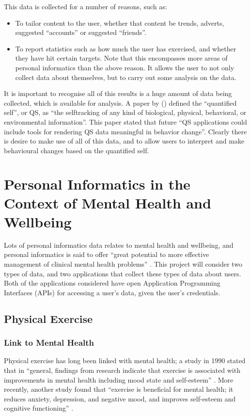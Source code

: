 \documentclass[11pt,openright,a4paper]{report}
\begin{document}
This data is collected for a number of reasons, such as:
\begin{itemize}
\item To tailor content to the user, whether that content be trends, adverts, suggested \enquote{accounts} or suggested \enquote{friends}.
\item To report statistics such as how much the user has exercised, and whether they have hit certain targets. Note that this encompasses more areas of personal informatics than the above reason. It allows the user to not only collect data about themselves, but to carry out some analysis on the data.
\end{itemize}

It is important to recognise all of this results is a huge amount of data being collected, which is available for analysis. A paper by \citeauthor{swan2013quantified} (\citeyear{swan2013quantified}) defined the \enquote{quantified self}, or QS, as \enquote{the selftracking of any kind of biological, physical, behavioral, or environmental information}. This paper stated that future \enquote{QS applications could include tools for rendering QS data meaningful in behavior change}. Clearly there is desire to make use of all of this data, and to allow users to interpret and make behavioural changes based on the quantified self.

\section{Personal Informatics in the Context of Mental Health and Wellbeing} \label{personalinformaticsmentalhealth}
Lots of personal informatics data relates to mental health and wellbeing, and personal informatics is said to offer \enquote{great potential to more effective management of clinical
mental health problems} \parencite{pimentalhealth}. This project will consider two types of data, and two applications that collect these types of data about users. Both of the applications considered have open Application Programming Interfaces (APIs) for accessing a user's data, given the user's credentials.

\subsection{Physical Exercise}
\subsubsection{Link to Mental Health}
Physical exercise has long been linked with mental health; a study in 1990 stated that in \enquote{general, findings from research indicate that exercise is associated with improvements in mental health including mood state and self-esteem} \parencite{raglin1990exercise}. More recently, another study found that \enquote{exercise is beneficial for mental health; it reduces anxiety, depression, and negative mood, and improves self-esteem and cognitive functioning} \parencite{callaghan2004exercise}.
\end{document}
